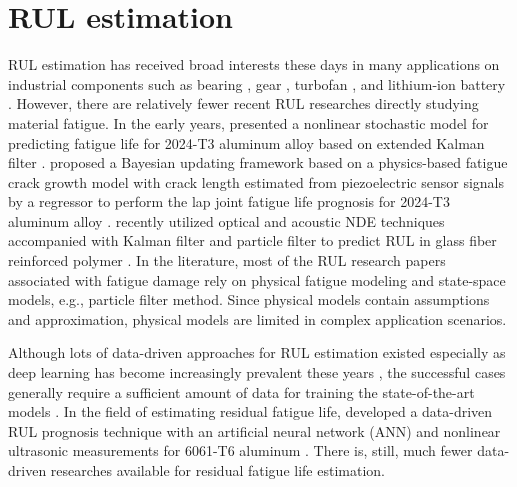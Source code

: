 \section{RUL estimation}
RUL estimation has received broad interests these days in many applications on industrial components such as bearing \cite{rul-nn-bearing-BENALI2015150, rul-cnn-bearing-LI20181, rul-ensemble-bearing}, gear \cite{rul-review-gear}, turbofan \cite{rul-statespace-turbo-battery-Mosallam2016,rul-cnn-turbo-LI20181,rul-rnn-turbo-WU2020241}, and lithium-ion battery \cite{rul-statespace-turbo-battery-Mosallam2016,rul-review-battery-LIPU2018115,rul-gpr-battery-9040661}. However, there are relatively fewer recent RUL researches directly studying material fatigue. In the early years,  presented a nonlinear stochastic model for predicting fatigue life for 2024-T3 aluminum alloy based on extended Kalman filter \cite{rul-statespace-fatigue-RAY1996}.  proposed a Bayesian updating framework based on a physics-based fatigue crack growth model with crack length estimated from piezoelectric sensor signals by a regressor to perform the lap joint fatigue life prognosis for 2024-T3 aluminum alloy \cite{rul-statespace-fatigue-PENG2015}.  recently utilized optical and acoustic NDE techniques accompanied with Kalman filter and particle filter to predict RUL in glass fiber reinforced polymer \cite{rul-statespace-fatigue-8819426}. In the literature, most of the RUL research papers associated with fatigue damage rely on physical fatigue modeling and state-space models, e.g., particle filter method. Since physical models contain assumptions and approximation, physical models are limited in complex application scenarios.

 Although lots of data-driven approaches for RUL estimation existed \cite{rul-review-SI20111, rul-review-LEI2018799} especially as deep learning has become increasingly prevalent these years \cite{rul-review-KHAN2018241}, the successful cases generally require a sufficient amount of data for training the state-of-the-art models \cite{rul-cnn-bearing-LI20181, rul-ensemble-bearing, rul-cnn-turbo-LI20181,rul-rnn-turbo-WU2020241, rul-gpr-battery-9040661}. In the field of estimating residual fatigue life,  developed a data-driven RUL prognosis technique with an artificial neural network (ANN) and nonlinear ultrasonic measurements for 6061-T6 aluminum \cite{rul-nn-fatigue-ultrasound-LIM2018185}. There is, still, much fewer data-driven researches available for residual fatigue life estimation. 

